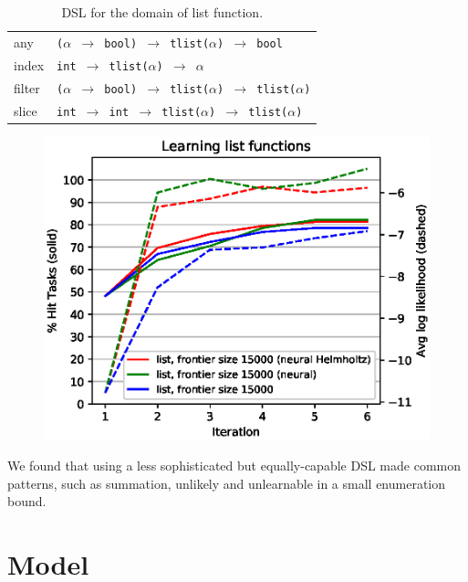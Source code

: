 \documentclass{article}
\begin{document}
\begin{table}
\begin{tabular}{| l | l |}
    any & \texttt{($\alpha$ $\rightarrow$ bool) $\rightarrow$ tlist($\alpha$) $\rightarrow$ bool} \\
    index & \texttt{int $\rightarrow$ tlist($\alpha$) $\rightarrow$ $\alpha$} \\
    filter & \texttt{($\alpha$ $\rightarrow$ bool) $\rightarrow$ tlist($\alpha$) $\rightarrow$ tlist($\alpha$)} \\
    slice & \texttt{int $\rightarrow$ int $\rightarrow$ tlist($\alpha$) $\rightarrow$ tlist($\alpha$)} \\
  \hline
\end{tabular}
\caption{DSL for the domain of list function.}
\label{listdsl}
\end{table}

\begin{figure}
  \includegraphics[width=\columnwidth]{figures/list.eps}
\end{figure}

We found that using a less sophisticated but equally-capable DSL made common
patterns, such as summation, unlikely and unlearnable in a small enumeration
bound.

\section{Model}
\end{document}
